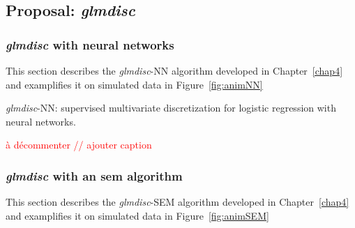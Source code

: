\subsection{Proposal: \textit{glmdisc}}


\subsubsection{\textit{glmdisc} with neural networks} \label{app1:glmdiscNN}

This section describes the \textit{glmdisc}-NN algorithm developed in Chapter~\ref{chap4} and examplifies it on simulated data in Figure~\ref{fig:animNN}

\begin{algorithm}[H]
 \caption{\label{NN-disc} \textit{glmdisc}-NN: supervised multivariate discretization for logistic regression with neural networks.}
\end{algorithm}



\textcolor{red}{à décommenter // ajouter caption}

\subsubsection{\textit{glmdisc} with an \gls{sem} algorithm} \label{app1:glmdiscSEM}

This section describes the \textit{glmdisc}-SEM algorithm developed in Chapter~\ref{chap4} and examplifies it on simulated data in Figure~\ref{fig:animSEM}

